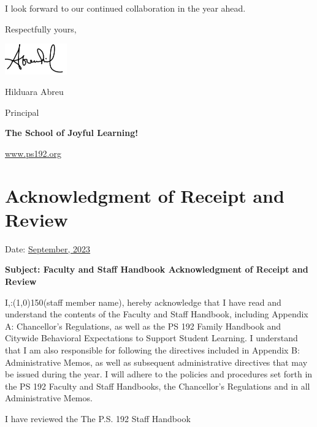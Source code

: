 \documentclass[11pt, letterpaper]{article}
\begin{document}
I look forward to our continued collaboration in the year ahead.

Respectfully yours,

\includegraphics[width=0.2\textwidth]{hil_signature}

Hilduara Abreu

Principal

\textbf{The School of Joyful Learning!}

\href{https:www.ps192.org}{www.ps192.org}
\pagebreak
\section{Acknowledgment of Receipt and Review}
Date: \href{https://www.ps192.org}{September, 2023} 

\textbf{Subject: Faculty and Staff Handbook Acknowledgment of Receipt and Review}
\vspace*{0.5in}

I,:\line(1,0){150}(staff member name), hereby acknowledge that I have read and understand the contents of the  Faculty and Staff Handbook, including Appendix A: Chancellor’s Regulations, as well as the PS 192  Family Handbook and Citywide Behavioral Expectations to Support Student Learning.  I understand that I am also responsible for following the directives included in Appendix B: Administrative Memos, as well as subsequent administrative directives that may be issued during the year. I will adhere to the policies and procedures set forth in the PS 192 Faculty and Staff  Handbooks, the Chancellor’s Regulations and in all Administrative Memos.

\vspace{3mm}

\faSquareO \hspace{1em} I have reviewed the The P.S. 192 Staff Handbook

\vspace{10mm}
\end{document}
